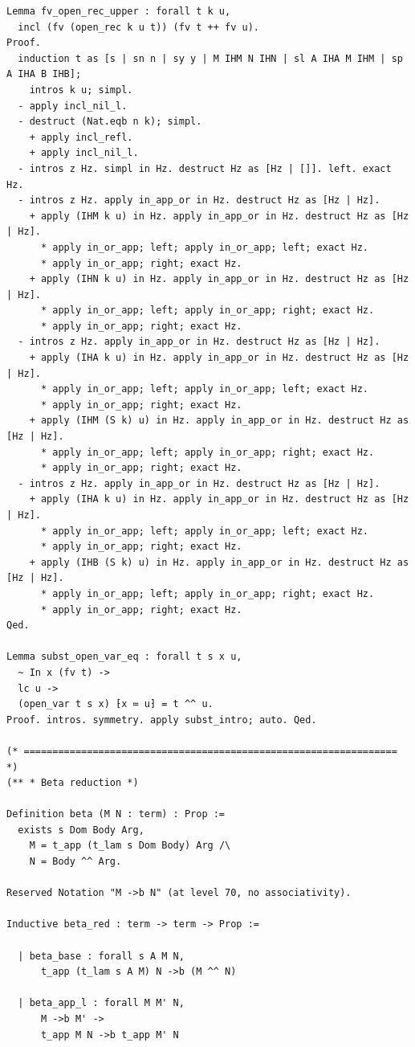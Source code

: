 \begin{latin}
\begin{verbatim}
Lemma fv_open_rec_upper : forall t k u,
  incl (fv (open_rec k u t)) (fv t ++ fv u).
Proof.
  induction t as [s | sn n | sy y | M IHM N IHN | sl A IHA M IHM | sp A IHA B IHB];
    intros k u; simpl.
  - apply incl_nil_l.
  - destruct (Nat.eqb n k); simpl.
    + apply incl_refl.
    + apply incl_nil_l.
  - intros z Hz. simpl in Hz. destruct Hz as [Hz | []]. left. exact Hz.
  - intros z Hz. apply in_app_or in Hz. destruct Hz as [Hz | Hz].
    + apply (IHM k u) in Hz. apply in_app_or in Hz. destruct Hz as [Hz | Hz].
      * apply in_or_app; left; apply in_or_app; left; exact Hz.
      * apply in_or_app; right; exact Hz.
    + apply (IHN k u) in Hz. apply in_app_or in Hz. destruct Hz as [Hz | Hz].
      * apply in_or_app; left; apply in_or_app; right; exact Hz.
      * apply in_or_app; right; exact Hz.
  - intros z Hz. apply in_app_or in Hz. destruct Hz as [Hz | Hz].
    + apply (IHA k u) in Hz. apply in_app_or in Hz. destruct Hz as [Hz | Hz].
      * apply in_or_app; left; apply in_or_app; left; exact Hz.
      * apply in_or_app; right; exact Hz.
    + apply (IHM (S k) u) in Hz. apply in_app_or in Hz. destruct Hz as [Hz | Hz].
      * apply in_or_app; left; apply in_or_app; right; exact Hz.
      * apply in_or_app; right; exact Hz.
  - intros z Hz. apply in_app_or in Hz. destruct Hz as [Hz | Hz].
    + apply (IHA k u) in Hz. apply in_app_or in Hz. destruct Hz as [Hz | Hz].
      * apply in_or_app; left; apply in_or_app; left; exact Hz.
      * apply in_or_app; right; exact Hz.
    + apply (IHB (S k) u) in Hz. apply in_app_or in Hz. destruct Hz as [Hz | Hz].
      * apply in_or_app; left; apply in_or_app; right; exact Hz.
      * apply in_or_app; right; exact Hz.
Qed.

Lemma subst_open_var_eq : forall t s x u,
  ~ In x (fv t) ->
  lc u ->
  (open_var t s x) ⁅x ≔ u⁆ = t ^^ u.
Proof. intros. symmetry. apply subst_intro; auto. Qed.

(* ================================================================= *)
(** * Beta reduction *)

Definition beta (M N : term) : Prop :=
  exists s Dom Body Arg,
    M = t_app (t_lam s Dom Body) Arg /\
    N = Body ^^ Arg.

Reserved Notation "M ->b N" (at level 70, no associativity).

Inductive beta_red : term -> term -> Prop :=

  | beta_base : forall s A M N,
      t_app (t_lam s A M) N ->b (M ^^ N)

  | beta_app_l : forall M M' N,
      M ->b M' ->
      t_app M N ->b t_app M' N


\end{verbatim}
\end{latin}
